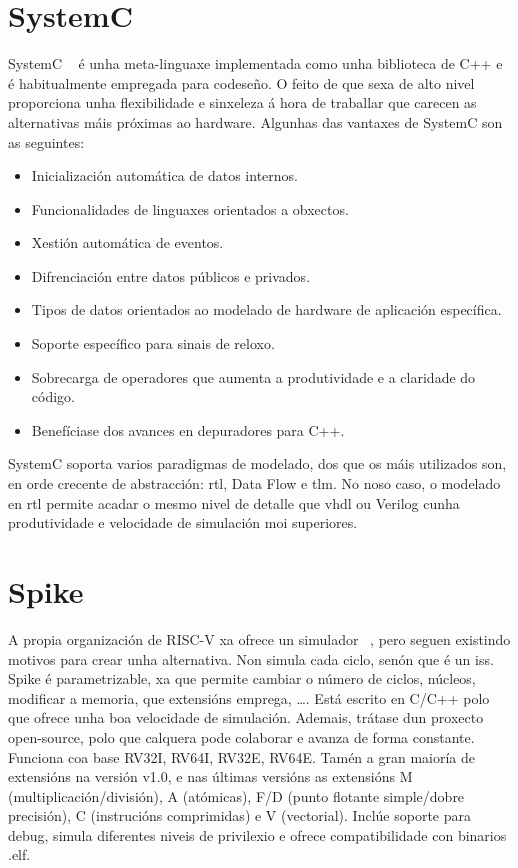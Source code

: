 \section{SystemC}\label{sec:systemc}
SystemC ~\cite{systemc} é unha \gls{meta-linguaxe} implementada como unha biblioteca de C++ e é habitualmente empregada para codeseño. O feito de que sexa de alto nivel proporciona unha flexibilidade e sinxeleza á hora de traballar que carecen as alternativas máis próximas ao hardware. Algunhas das vantaxes de SystemC son as seguintes:

\begin{itemize}
    \item Inicialización automática de datos internos.
    \item Funcionalidades de linguaxes orientados a obxectos.
    \item Xestión automática de eventos.
    \item Difrenciación entre datos públicos e privados.
    \item Tipos de datos orientados ao modelado de hardware de aplicación específica.
    \item Soporte específico para sinais de reloxo.
    \item Sobrecarga de operadores que aumenta a produtividade e a claridade do código.
    \item Benefíciase dos avances en depuradores para C++.
\end{itemize}

SystemC soporta varios paradigmas de modelado, dos que os máis utilizados son, en orde crecente de abstracción: \acrfull{rtl}, Data Flow e \acrfull{tlm}. No noso caso, o modelado en \acrshort{rtl} permite acadar o mesmo nivel de detalle que \acrshort{vhdl} ou Verilog cunha produtividade e velocidade de simulación moi superiores.


\section{Spike}\label{sec:spike}
A propia organización de RISC-V xa ofrece un simulador ~\cite{sim_spike}, pero seguen existindo motivos para crear unha alternativa. Non simula cada ciclo, senón que é un \acrfull{iss}. Spike é parametrizable, xa que permite cambiar o número de ciclos, núcleos, modificar a memoria, que extensións emprega, \dots. Está escrito en C/C++ polo que ofrece unha boa velocidade de simulación. Ademais, trátase dun proxecto open-source, polo que calquera pode colaborar e  avanza de forma constante. Funciona coa base RV32I, RV64I, RV32E, RV64E. Tamén a gran maioría de extensións na versión v1.0, e nas últimas versións as extensións M (multiplicación/división), A (atómicas), F/D (punto flotante simple/dobre precisión), C (instrucións comprimidas) e V (vectorial). Inclúe soporte para debug, simula diferentes niveis de privilexio e ofrece compatibilidade con binarios .elf. 

